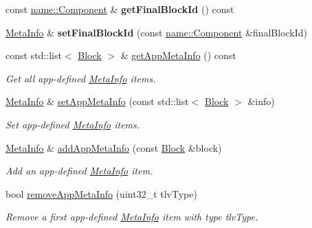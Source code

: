 \begin{DoxyCompactItemize}
\item 
const \hyperlink{classndn_1_1name_1_1Component}{name\+::\+Component} \& {\bfseries get\+Final\+Block\+Id} () const\hypertarget{classndn_1_1MetaInfo_af371ed43ca8a59f89f2c97fd5fbf298b}{}\label{classndn_1_1MetaInfo_af371ed43ca8a59f89f2c97fd5fbf298b}

\item 
\hyperlink{classndn_1_1MetaInfo}{Meta\+Info} \& {\bfseries set\+Final\+Block\+Id} (const \hyperlink{classndn_1_1name_1_1Component}{name\+::\+Component} \&final\+Block\+Id)\hypertarget{classndn_1_1MetaInfo_ae64c04d0b5251847e4fc670fe7239c23}{}\label{classndn_1_1MetaInfo_ae64c04d0b5251847e4fc670fe7239c23}

\item 
const std\+::list$<$ \hyperlink{classndn_1_1Block}{Block} $>$ \& \hyperlink{classndn_1_1MetaInfo_adfda91bf9c51c47a15f24005e13f224e}{get\+App\+Meta\+Info} () const
\begin{DoxyCompactList}\small\item\em Get all app-\/defined \hyperlink{classndn_1_1MetaInfo}{Meta\+Info} items. \end{DoxyCompactList}\item 
\hyperlink{classndn_1_1MetaInfo}{Meta\+Info} \& \hyperlink{classndn_1_1MetaInfo_a6a65c2ce327d81ea2f19d089010d4d08}{set\+App\+Meta\+Info} (const std\+::list$<$ \hyperlink{classndn_1_1Block}{Block} $>$ \&info)
\begin{DoxyCompactList}\small\item\em Set app-\/defined \hyperlink{classndn_1_1MetaInfo}{Meta\+Info} items. \end{DoxyCompactList}\item 
\hyperlink{classndn_1_1MetaInfo}{Meta\+Info} \& \hyperlink{classndn_1_1MetaInfo_a67f61b669bb025ffad7b9c960c61c821}{add\+App\+Meta\+Info} (const \hyperlink{classndn_1_1Block}{Block} \&block)
\begin{DoxyCompactList}\small\item\em Add an app-\/defined \hyperlink{classndn_1_1MetaInfo}{Meta\+Info} item. \end{DoxyCompactList}\item 
bool \hyperlink{classndn_1_1MetaInfo_aff0dfe058a669d717ed57322531cd974}{remove\+App\+Meta\+Info} (uint32\+\_\+t tlv\+Type)
\begin{DoxyCompactList}\small\item\em Remove a first app-\/defined \hyperlink{classndn_1_1MetaInfo}{Meta\+Info} item with type {\ttfamily tlv\+Type}. \end{DoxyCompactList}\item 

\end{DoxyCompactItemize}
